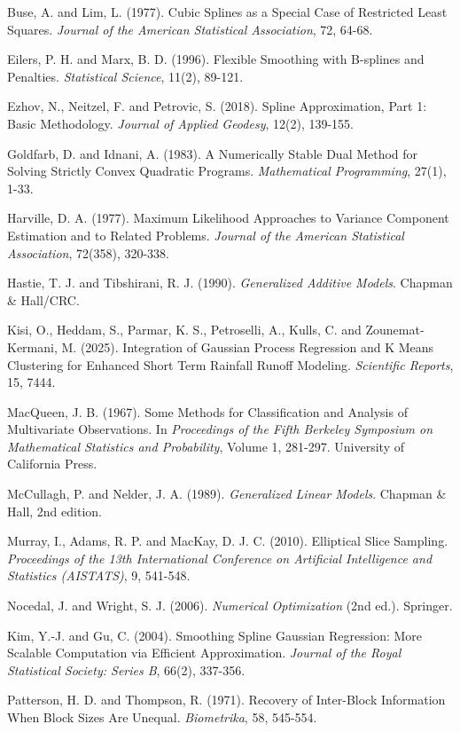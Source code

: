 \begin{References}
Buse, A. and Lim, L. (1977). Cubic Splines as a Special Case of
Restricted Least Squares. \emph{Journal of the American Statistical
Association}, 72, 64-68.

Eilers, P. H. and Marx, B. D. (1996). Flexible Smoothing with B-splines
and Penalties. \emph{Statistical Science}, 11(2), 89-121.

Ezhov, N., Neitzel, F. and Petrovic, S. (2018). Spline Approximation,
Part 1: Basic Methodology. \emph{Journal of Applied Geodesy}, 12(2),
139-155.

Goldfarb, D. and Idnani, A. (1983). A Numerically Stable Dual Method for
Solving Strictly Convex Quadratic Programs. \emph{Mathematical
Programming}, 27(1), 1-33.

Harville, D. A. (1977). Maximum Likelihood Approaches to Variance
Component Estimation and to Related Problems. \emph{Journal of the
American Statistical Association}, 72(358), 320-338.

Hastie, T. J. and Tibshirani, R. J. (1990). \emph{Generalized Additive
Models}. Chapman \& Hall/CRC.

Kisi, O., Heddam, S., Parmar, K. S., Petroselli, A., Kulls, C. and
Zounemat-Kermani, M. (2025). Integration of Gaussian Process Regression
and K Means Clustering for Enhanced Short Term Rainfall Runoff Modeling.
\emph{Scientific Reports}, 15, 7444.

MacQueen, J. B. (1967). Some Methods for Classification and Analysis of
Multivariate Observations. In \emph{Proceedings of the Fifth Berkeley
Symposium on Mathematical Statistics and Probability}, Volume 1,
281-297. University of California Press.

McCullagh, P. and Nelder, J. A. (1989). \emph{Generalized Linear Models}.
Chapman \& Hall, 2nd edition.

Murray, I., Adams, R. P. and MacKay, D. J. C. (2010). Elliptical Slice
Sampling. \emph{Proceedings of the 13th International Conference on
Artificial Intelligence and Statistics (AISTATS)}, 9, 541-548.

Nocedal, J. and Wright, S. J. (2006). \emph{Numerical Optimization}
(2nd ed.). Springer.

Kim, Y.-J. and Gu, C. (2004). Smoothing Spline Gaussian Regression:
More Scalable Computation via Efficient Approximation. \emph{Journal of
the Royal Statistical Society: Series B}, 66(2), 337-356.

Patterson, H. D. and Thompson, R. (1971). Recovery of Inter-Block
Information When Block Sizes Are Unequal. \emph{Biometrika}, 58,
545-554.


\end{References}
